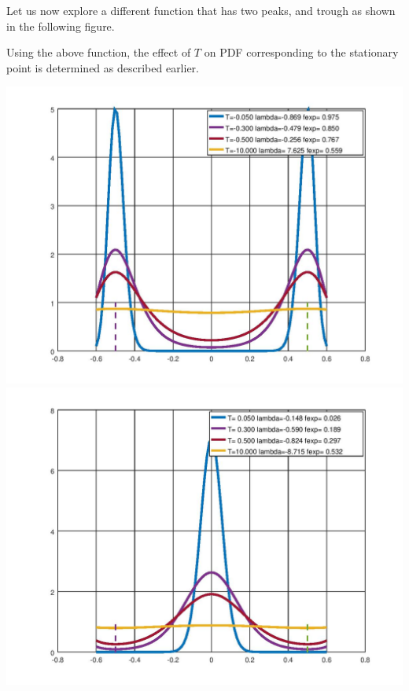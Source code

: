 \documentclass{article}
\begin{document}
Let us now explore a different function that has two peaks, and trough as shown in the
following figure. 
\begin{tcolorbox}[fonttitle=\sffamily\bfseries\large,
    title={$y(x)=8(1-2x^2)x^2  -0.6<x<0.6  $} ]
    \centering
     
\end{tcolorbox}

Using the above function, the effect of $T$ on PDF corresponding to the stationary
point is determined as described earlier.

\begin{tcolorbox}[fonttitle=\sffamily\bfseries\large,
    title=Effect of $T$ on PDF at stationary condition]
     \includegraphics[scale=0.3]{fig3.jpg}
     \hspace{1cm}
     \includegraphics[scale=0.3]{fig4.jpg}
\end{tcolorbox}
\end{document}
